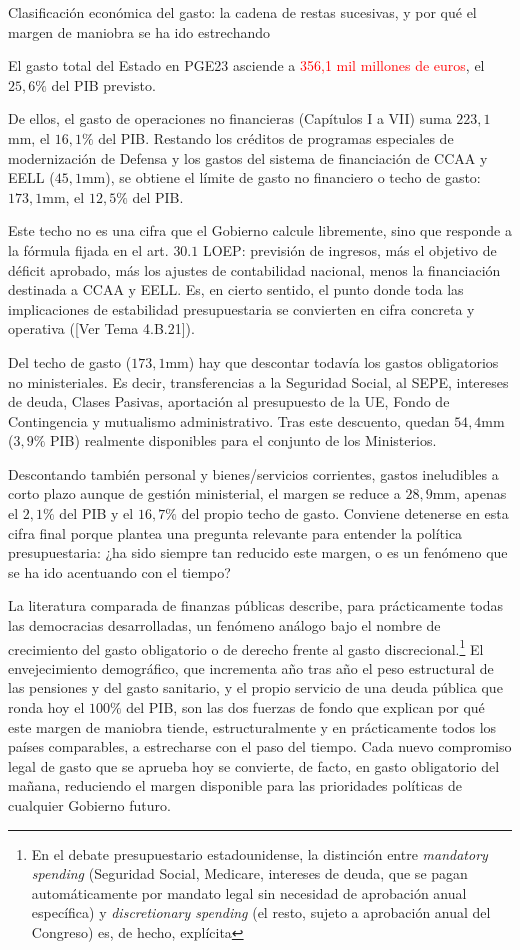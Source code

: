 \documentclass[10pt,a4paper]{article}
\newcommand{\authorfont}[1]{{\fontfamily{EBGaramond-TLF}\selectfont #1}}
\begin{document}
Clasificación económica del gasto: la cadena de restas sucesivas, y por qué el margen de maniobra se ha ido estrechando

El gasto total del Estado en PGE23 asciende a \textcolor{red}{356,1 mil millones de euros}, el $25,6\%$ del PIB previsto. 

De ellos, el gasto de operaciones no financieras (Capítulos I a VII) suma $223,1$mm, el $16,1\%$ del PIB. Restando los créditos de programas especiales de modernización de Defensa y los gastos del sistema de financiación de CCAA y EELL ($45,1$mm), se obtiene el límite de gasto no financiero o techo de gasto: $173,1$mm, el $12,5\%$ del PIB.

Este techo no es una cifra que el Gobierno calcule libremente, sino que responde a la fórmula fijada en el art. $30.1$ LOEP: previsión de ingresos, más el objetivo de déficit aprobado, más los ajustes de contabilidad nacional, menos la financiación destinada a CCAA y EELL. Es, en cierto sentido, el punto donde toda las implicaciones de estabilidad presupuestaria se convierten en cifra concreta y operativa ([\authorfont{Ver Tema 4.B.21}]).

Del techo de gasto ($173,1$mm) hay que descontar todavía los gastos obligatorios no ministeriales. Es decir, transferencias a la Seguridad Social, al SEPE, intereses de deuda, Clases Pasivas, aportación al presupuesto de la UE, Fondo de Contingencia y mutualismo administrativo. Tras este descuento, quedan $54,4$mm ($3,9\%$ PIB) realmente disponibles para el conjunto de los Ministerios. 

Descontando también personal y bienes/servicios corrientes, gastos ineludibles a corto plazo aunque de gestión ministerial, el margen se reduce a $28,9$mm, apenas el $2,1\%$ del PIB y el $16,7\%$ del propio techo de gasto. Conviene detenerse en esta cifra final porque plantea una pregunta relevante para entender la política presupuestaria: ¿ha sido siempre tan reducido este margen, o es un fenómeno que se ha ido acentuando con el tiempo? 

La literatura comparada de finanzas públicas describe, para prácticamente todas las democracias desarrolladas, un fenómeno análogo bajo el nombre de crecimiento del gasto obligatorio o de derecho frente al gasto discrecional.\footnote{%
    En el debate presupuestario estadounidense, la distinción entre \textit{mandatory spending} (Seguridad Social, Medicare, intereses de deuda, que se pagan automáticamente por mandato legal sin necesidad de aprobación anual específica) y \textit{discretionary spending} (el resto, sujeto a aprobación anual del Congreso) es, de hecho, explícita
} El envejecimiento demográfico, que incrementa año tras año el peso estructural de las pensiones y del gasto sanitario, y el propio servicio de una deuda pública que ronda hoy el $100\%$ del PIB, son las dos fuerzas de fondo que explican por qué este margen de maniobra tiende, estructuralmente y en prácticamente todos los países comparables, a estrecharse con el paso del tiempo. Cada nuevo compromiso legal de gasto que se aprueba hoy se convierte, de facto, en gasto obligatorio del mañana, reduciendo el margen disponible para las prioridades políticas de cualquier Gobierno futuro.
\end{document}
